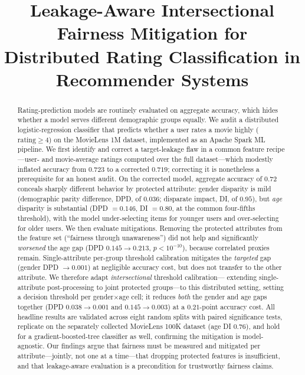 \documentclass[conference]{IEEEtran}
\begin{document}
\title{Leakage-Aware Intersectional Fairness Mitigation for\\
Distributed Rating Classification in Recommender Systems}

\author{
}

\maketitle
\thispagestyle{firstpage}

\begin{abstract}
Rating-prediction models are routinely evaluated on aggregate accuracy, which
hides whether a model serves different demographic groups equally. We audit a
distributed logistic-regression classifier that predicts whether a user rates a
movie highly ($\text{rating}\geq 4$) on the MovieLens 1M dataset, implemented as an
Apache Spark ML pipeline. We first identify and correct a target-leakage flaw in a
common feature recipe---user- and movie-average ratings computed over the full
dataset---which modestly inflated accuracy from $0.723$ to a corrected $0.719$;
correcting it is nonetheless a prerequisite for an honest audit. On the corrected
model, aggregate accuracy of $0.72$ conceals sharply different behavior by protected
attribute: gender disparity is mild (demographic parity difference, DPD, of $0.036$;
disparate impact, DI, of $0.95$), but \emph{age} disparity is substantial
(DPD $=0.146$, DI $=0.80$, at the common four-fifths threshold), with the model
under-selecting items for younger users and over-selecting for older users. We then
evaluate mitigations. Removing the protected attributes from the feature set
(``fairness through unawareness'') did not help and significantly \emph{worsened} the
age gap (DPD $0.145\rightarrow0.213$, $p<10^{-10}$), because correlated proxies remain.
Single-attribute per-group threshold calibration mitigates the \emph{targeted} gap
(gender DPD $\rightarrow 0.001$) at negligible accuracy cost, but does not transfer to
the other attribute. We therefore adapt \emph{intersectional} threshold calibration---
extending single-attribute post-processing to joint protected groups---to this distributed
setting, setting a decision threshold per gender$\times$age cell; it reduces \emph{both} the
gender and age gaps together (DPD $0.038\rightarrow0.001$ and $0.145\rightarrow0.003$) at
a $0.21$-point accuracy cost. All headline results are validated across eight random
splits with paired significance tests, replicate on the separately collected MovieLens
100K dataset (age DI $0.76$), and hold for a gradient-boosted-tree classifier as well,
confirming the mitigation is model-agnostic. Our findings argue that fairness must be
measured and mitigated per attribute---jointly, not one at a time---that dropping protected
features is insufficient, and that leakage-aware evaluation is a precondition for
trustworthy fairness claims.
\end{abstract}
\end{document}
